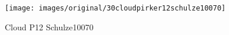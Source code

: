 \begin{figure}[!h] 
\centering 
\texttt{[image: images/original/30cloudpirker12schulze10070]}
\caption{Cloud P12 Schulze10070}
\label{fig:30cloudpirker12schulze10070} 
\end{figure}


